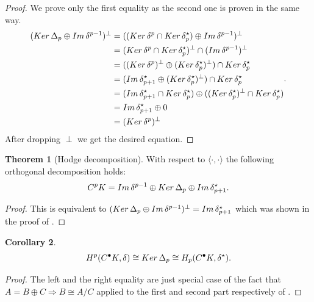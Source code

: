 \documentclass{elsarticle}
\theoremstyle{definition}
\newtheorem{theorem}{Theorem}[section]
\newtheorem{corollary}[theorem]{Corollary}
\newcommand{\inner}[2]{\langle#1,#2\rangle}
\newcommand{\Ker}{\mathop{\rm Ker}\nolimits}
\renewcommand{\Im}{\mathop{\rm Im}\nolimits}
\begin{document}
\begin{proof}
  We prove only the first equality as the second one is proven in the same way.
  \begin{equation}
    \begin{split}
      (\Ker \Delta_p \oplus \Im \delta^{p - 1})^\perp 
        & = ((\Ker \delta^p \cap \Ker \delta^\star_p)
    	    \oplus \Im \delta^{p - 1})^\perp \\
        & = (\Ker \delta^p \cap \Ker \delta^\star_p)^\perp
    	    \cap (\Im \delta^{p - 1})^\perp \\
        & = ((\Ker \delta^p)^\perp \oplus (\Ker \delta^\star_p)^\perp)
            \cap \Ker \delta^\star_p \\
        & = (\Im \delta^\star_{p + 1} \oplus (\Ker \delta^\star_p)^\perp) 
    	    \cap \Ker \delta^\star_p  \\
        & = (\Im \delta^\star_{p + 1} \cap \Ker \delta^\star_p) 
            \oplus ((\Ker \delta^\star_p)^\perp \cap \Ker \delta^\star_p) \\
        & = \Im \delta^\star_{p + 1} \oplus 0 \\
        & = (\Ker \delta^p)^\perp
    \end{split}.
  \end{equation}
  After dropping $\perp$ we get the desired equation.
\end{proof}
\begin{theorem}[Hodge decomposition]
\label{thm:hodge}
  With respect to $\inner{\cdot}{\cdot}$ the following orthogonal decomposition holds:
  \begin{equation}
    C^p K = 
      \Im \delta^{p - 1}
      \oplus \Ker \Delta_p
      \oplus \Im \delta^\star_{p + 1}.
  \end{equation}
\end{theorem}
\begin{proof}
  This is equivalent to $(\Ker \Delta_p \oplus \Im \delta^{p - 1})^\perp = \Im \delta^\star_{p + 1}$ which was shown in the proof of .
\end{proof}
\begin{corollary}
\label{thm:cohomology_equals_harmonic}
  \begin{equation}
    H^p(C^{\bullet} K, \delta) 
      \cong \Ker \Delta_p 
      \cong H_p(C^{\bullet} K, \delta^\star).
  \end{equation}
\end{corollary}
\begin{proof}
  The left and the right equality are just special case of the fact that $A = B \oplus C \Rightarrow B \cong A / C$ applied to the first and second part respectively of .
\end{proof}
\end{document}
